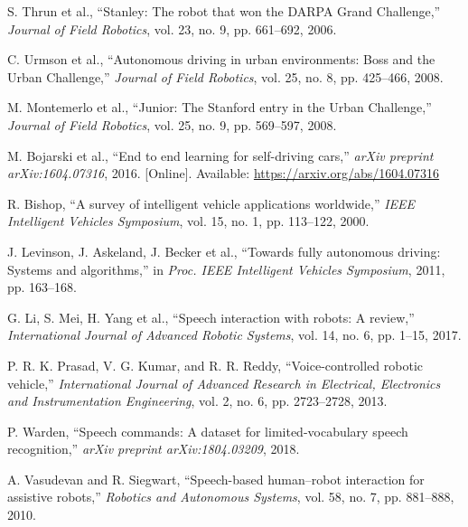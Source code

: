 \documentclass[conference]{IEEEtran}
\begin{document}
\begin{thebibliography}{00}

S. Thrun et al., ``Stanley: The robot that won the DARPA Grand Challenge,'' \textit{Journal of Field Robotics}, vol. 23, no. 9, pp. 661–692, 2006.

C. Urmson et al., ``Autonomous driving in urban environments: Boss and the Urban Challenge,'' \textit{Journal of Field Robotics}, vol. 25, no. 8, pp. 425–466, 2008.

M. Montemerlo et al., ``Junior: The Stanford entry in the Urban Challenge,'' \textit{Journal of Field Robotics}, vol. 25, no. 9, pp. 569–597, 2008.

M. Bojarski et al., ``End to end learning for self-driving cars,'' \textit{arXiv preprint arXiv:1604.07316}, 2016. [Online]. Available: \url{https://arxiv.org/abs/1604.07316}

R. Bishop, ``A survey of intelligent vehicle applications worldwide,'' \textit{IEEE Intelligent Vehicles Symposium}, vol. 15, no. 1, pp. 113–122, 2000.

J. Levinson, J. Askeland, J. Becker et al., ``Towards fully autonomous driving: Systems and algorithms,'' in \textit{Proc. IEEE Intelligent Vehicles Symposium}, 2011, pp. 163–168.

G. Li, S. Mei, H. Yang et al., ``Speech interaction with robots: A review,'' \textit{International Journal of Advanced Robotic Systems}, vol. 14, no. 6, pp. 1–15, 2017.

P. R. K. Prasad, V. G. Kumar, and R. R. Reddy, ``Voice-controlled robotic vehicle,'' \textit{International Journal of Advanced Research in Electrical, Electronics and Instrumentation Engineering}, vol. 2, no. 6, pp. 2723–2728, 2013.

P. Warden, ``Speech commands: A dataset for limited-vocabulary speech recognition,'' \textit{arXiv preprint arXiv:1804.03209}, 2018.

A. Vasudevan and R. Siegwart, ``Speech-based human–robot interaction for assistive robots,'' \textit{Robotics and Autonomous Systems}, vol. 58, no. 7, pp. 881–888, 2010.

\end{thebibliography}
\end{document}

